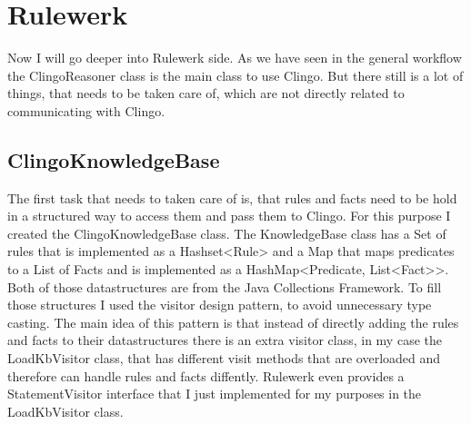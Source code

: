 \documentclass[hyperref, bachelorofscience]{cgvpub}
\begin{document}
\section{Rulewerk}
Now I will go deeper into Rulewerk side. As we have seen in the general workflow the ClingoReasoner class is the main class to use Clingo. But there still is a lot of things, that needs to be taken care of, which are not directly related to communicating with Clingo.
\subsection{ClingoKnowledgeBase} 
The first task that needs to taken care of is, that rules and facts need to be hold in a structured way to access them and pass them to Clingo. For this purpose I created the ClingoKnowledgeBase class. The KnowledgeBase class has a Set of rules that is implemented as a Hashset<Rule> and a Map that maps predicates to a List of Facts and is implemented as a HashMap<Predicate, List<Fact>>. Both of those datastructures are from the Java Collections Framework.  
To fill those structures I used the visitor design pattern, to avoid unnecessary type casting. The main idea of this pattern is that instead of directly adding the rules and facts to their datastructures there is an extra visitor class, in my case the LoadKbVisitor class, that has different visit methods that are overloaded and therefore can handle rules and facts diffently.
Rulewerk even provides a StatementVisitor interface that I just implemented for my purposes in the LoadKbVisitor class.\\
\begin{center}
\end{center}
\end{document}
